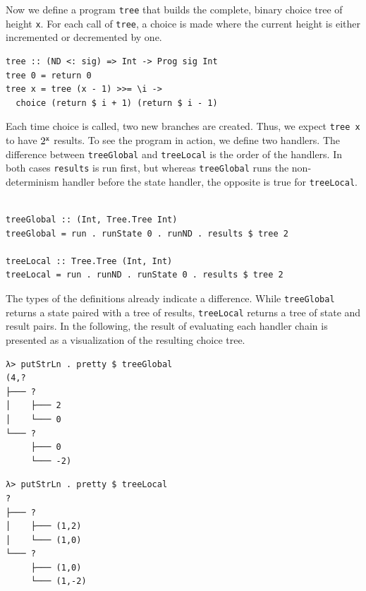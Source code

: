 \documentclass[a4paper, 11pt, fleqn, twoside]{scrreprt}
\newcommand{\hinl}[1]{\texttt{#1}}
\begin{document}
Now we define a program \hinl{tree} that builds the complete, binary choice tree of height \hinl{x}.
For each call of \hinl{tree}, a choice is made where the current height is either incremented or decremented by one.

\begin{verbatim}
tree :: (ND <: sig) => Int -> Prog sig Int
tree 0 = return 0
tree x = tree (x - 1) >>= \i -> 
  choice (return $ i + 1) (return $ i - 1)
\end{verbatim}

Each time choice is called, two new branches are created.
Thus, we expect \hinl{tree x} to have $2^\text{\hinl{x}}$ results.
To see the program in action, we define two handlers.
The difference between \hinl{treeGlobal} and \hinl{treeLocal} is the order of the handlers.
In both cases \hinl{results} is run first, but whereas \hinl{treeGlobal} runs the non-determinism handler before the state handler, the opposite is true for \hinl{treeLocal}.

\begin{verbatim}

treeGlobal :: (Int, Tree.Tree Int)
treeGlobal = run . runState 0 . runND . results $ tree 2

treeLocal :: Tree.Tree (Int, Int)
treeLocal = run . runND . runState 0 . results $ tree 2
\end{verbatim}

The types of the definitions already indicate a difference.
While \hinl{treeGlobal} returns a state paired with a tree of results, \hinl{treeLocal} returns a tree of state and result pairs.
In the following, the result of evaluating each handler chain is presented as a visualization of the resulting choice tree.

\vspace{0.32cm}

\begin{minipage}{.465 \linewidth}
\begin{verbatim}
λ> putStrLn . pretty $ treeGlobal
(4,?
├─── ?
│    ├─── 2
│    └─── 0
└─── ?
     ├─── 0
     └─── -2)
\end{verbatim}
\end{minipage}
\hfill
\vline
\hfill
\begin{minipage}{.475 \linewidth}
\begin{verbatim}
λ> putStrLn . pretty $ treeLocal
?
├─── ?
│    ├─── (1,2)
│    └─── (1,0)
└─── ?
     ├─── (1,0)
     └─── (1,-2)
\end{verbatim}
\end{minipage}
\end{document}
